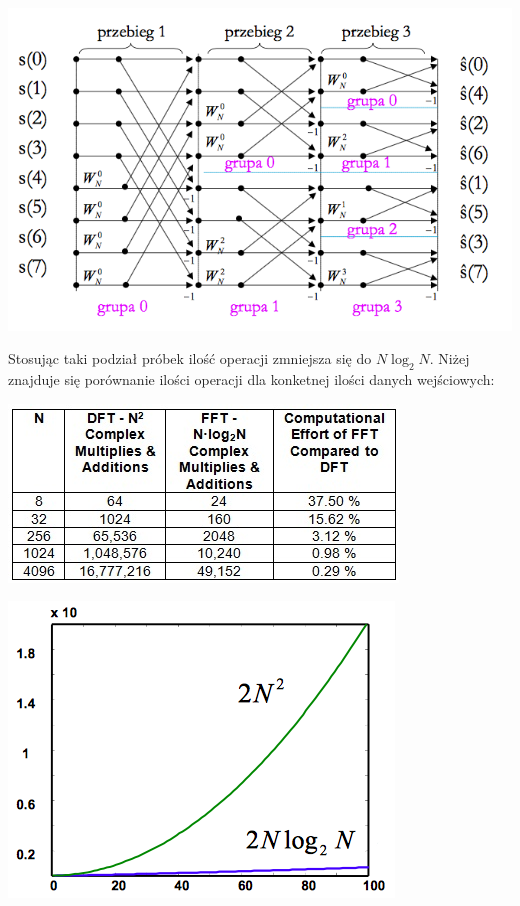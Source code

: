 \documentclass{article}
\begin{document}
\begin{center}
    \includegraphics[scale=0.3]{sc4}
\end{center}
\newpage
Stosując taki podział próbek ilość operacji zmniejsza się do $N \log_{2} N$. Niżej znajduje się porównanie ilości operacji dla konketnej ilości danych wejściowych:
\begin{center}
    \includegraphics[scale=0.7]{sc5}
\end{center}
\begin{center}
    \includegraphics[scale=0.5]{sc6}
\end{center}
\end{document}
